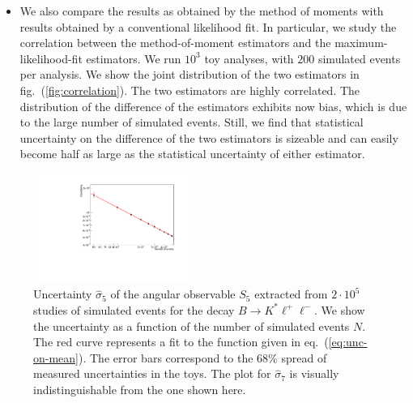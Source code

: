 \documentclass[aps,nofootinbib,preprintnumbers,prd,twocolumn]{revtex4-1}
\newcommand{\est}[1]{\widehat{#1}}
\newcommand{\refeq}[1]{eq.~(\ref{eq:#1})}
\newcommand{\reffig}[1]{fig.~(\ref{fig:#1})}
\begin{document}
\begin{itemize}
    \item We also compare the results as obtained by the method of moments with
        results obtained by a conventional likelihood fit. In particular, we
        study the correlation between the method-of-moment estimators and the
        maximum-likelihood-fit estimators. We run $10^3$ toy analyses, with
        $200$ simulated events per analysis. We show the joint distribution of
        the two estimators in \reffig{correlation}. The two estimators are
        highly correlated. The distribution of the difference of the estimators
        exhibits now bias, which is due to the large number of simulated
        events.  Still, we find that statistical uncertainty on the difference
        of the two estimators is sizeable and can easily become half as large
        as the statistical uncertainty of either estimator.
\end{itemize}
\begin{figure}[t]
        \centering
            \includegraphics[width=0.45\textwidth]{figs/Q2_1_2_S5.pdf}
            \caption{Uncertainty $\est{\sigma}_5$ of the angular
              observable $S_5$ extracted from $2\cdot 10^5$ studies of
              simulated events for the decay $B\to
              K^*\ell^+\ell^-$. We show the uncertainty as a function
              of the number of simulated events $N$.  The red curve
              represents a fit to the function given in
              \refeq{unc-on-mean}. The error bars correspond to the
              $68\%$ spread of measured uncertainties in the toys. The
              plot for $\est{\sigma}_7$ is visually indistinguishable
              from the one shown here.}
        \label{fig:errors}
\end{figure}
\end{document}
